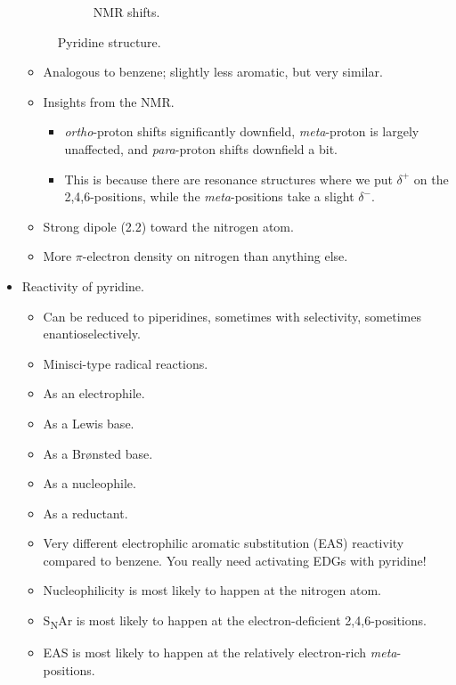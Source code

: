 \documentclass[../notes.tex]{subfiles}
\begin{document}
\begin{itemize}
\begin{figure}[H]
\begin{subfigure}[b]{0.3\linewidth}
            \caption{ NMR shifts.}
            \label{fig:PyStructurec}
        \end{subfigure}
        \caption{Pyridine structure.}
        \label{fig:PyStructure}
    \end{figure}
    \begin{itemize}
        \item Analogous to benzene; slightly less aromatic, but very similar.
        \item Insights from the  NMR.
        \begin{itemize}
            \item \emph{ortho}-proton shifts significantly downfield, \emph{meta}-proton is largely unaffected, and \emph{para}-proton shifts downfield a bit.
            \item This is because there are resonance structures where we put $\delta^+$ on the 2,4,6-positions, while the \emph{meta}-positions take a slight $\delta^-$.
        \end{itemize}
        \item Strong dipole (\SI{2.2}{\debye}) toward the nitrogen atom.
        \item More $\pi$-electron density on nitrogen than anything else.
    \end{itemize}
    \item Reactivity of pyridine.
    \begin{itemize}
        \item Can be reduced to piperidines, sometimes with selectivity, sometimes enantioselectively.
        \item Minisci-type radical reactions.
        \item As an electrophile.
        \item As a Lewis base.
        \item As a Br\o nsted base.
        \item As a nucleophile.
        \item As a reductant.
        \item Very different electrophilic aromatic substitution (EAS) reactivity compared to benzene. You really need activating EDGs with pyridine!
        \item Nucleophilicity is most likely to happen at the nitrogen atom.
        \item S\textsubscript{N}Ar is most likely to happen at the electron-deficient 2,4,6-positions.
        \item EAS is most likely to happen at the relatively electron-rich \emph{meta}-positions.

\end{itemize}
\end{itemize}
\end{document}
